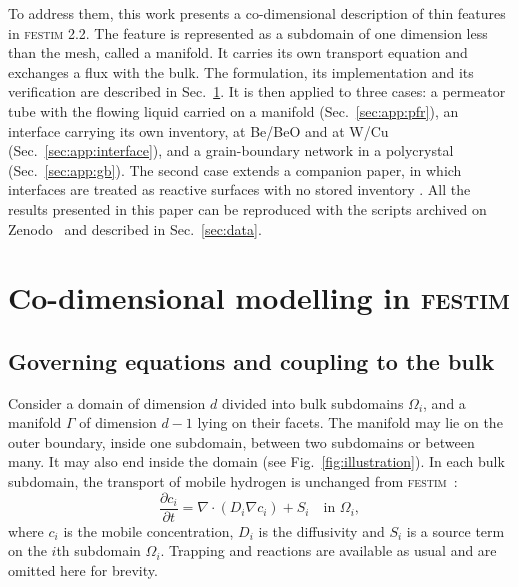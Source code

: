 \documentclass[5p]{elsarticle}
\newcommand{\FESTIM}{\textsc{festim}}
\begin{document}
To address them, this work presents a co-dimensional description of thin features in \FESTIM{} 2.2.
The feature is represented as a subdomain of one dimension less than the mesh, called a manifold.
It carries its own transport equation and exchanges a flux with the bulk.
The formulation, its implementation and its verification are described in Sec.~\ref{sec:method}.
It is then applied to three cases: a permeator tube with the flowing liquid carried on a manifold (Sec.~\ref{sec:app:pfr}), an interface carrying its own inventory, at Be/BeO and at W/Cu (Sec.~\ref{sec:app:interface}), and a grain-boundary network in a polycrystal (Sec.~\ref{sec:app:gb}).
The second case extends a companion paper, in which interfaces are treated as reactive surfaces with no stored inventory \cite{delaportemathurin2026chemicalpotentialcontinuityfails}. All the results presented in this paper can be reproduced with the scripts archived on Zenodo~\cite{james_dark_2026_24349184} and described in Sec.~\ref{sec:data}.




\section{Co-dimensional modelling in \FESTIM{}}
\label{sec:method}

\subsection{Governing equations and coupling to the bulk}
\label{sec:method:governing}

Consider a domain of dimension $d$ divided into bulk subdomains $\Omega_i$, and a manifold $\Gamma$ of dimension $d-1$ lying on their facets.
The manifold may lie on the outer boundary, inside one subdomain, between two subdomains or between many.
It may also end inside the domain (see Fig.~\ref{fig:illustration}).
In each bulk subdomain, the transport of mobile hydrogen is unchanged from \FESTIM{}~\cite{dark_festim_2026}:
\begin{equation}
    \frac{\partial c_i}{\partial t} = \nabla \cdot \left( D_i \nabla c_i \right) + S_i \quad \text{in } \Omega_i,
    \label{eq:bulk}
\end{equation}
where $c_i$ is the mobile concentration, $D_i$ is the diffusivity and $S_i$ is a source term on the $i$th subdomain $\Omega_i$.
Trapping and reactions are available as usual and are omitted here for brevity.
\end{document}
